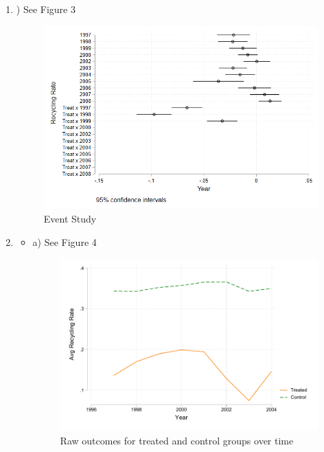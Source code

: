 \documentclass{article}
\begin{document}
\begin{enumerate}
\item ) See Figure 3

\begin{figure}[htbp]
    \centering
    \includegraphics[width=\textwidth]{HW8Q4.png}
    \caption{Event Study}
    \label{fig:your_image_label}
\end{figure}

\item 

\begin {itemize}

 \item a) See Figure 4
\begin{figure}[htbp]
    \centering
    \includegraphics[width=\textwidth]{HW8Q5a.pdf}
    \caption{Raw outcomes for treated and control groups over time}
    \label{fig:your_image_label}
\end{figure}


\end{itemize}
\end{enumerate}
\end{document}
